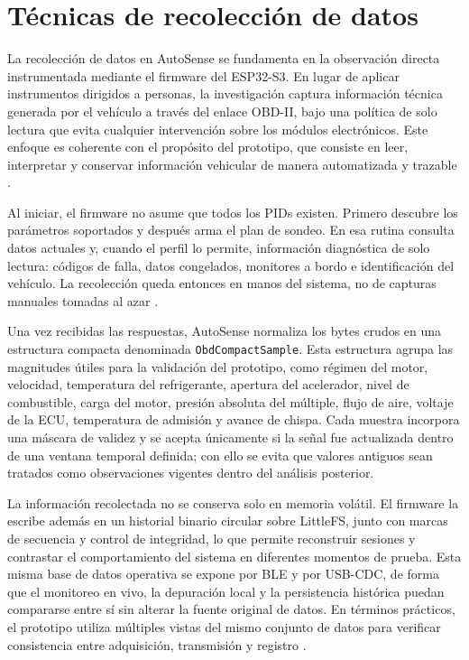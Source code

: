 \documentclass[12pt,letterpaper]{report}
\begin{document}
\section{Técnicas de recolección de datos}

\label{sec:tecnicas-recoleccion-datos}

La recolección de datos en AutoSense se fundamenta en la observación directa instrumentada mediante el firmware del ESP32-S3. En lugar de aplicar instrumentos dirigidos a personas, la investigación captura información técnica generada por el vehículo a través del enlace OBD-II, bajo una política de solo lectura que evita cualquier intervención sobre los módulos electrónicos. Este enfoque es coherente con el propósito del prototipo, que consiste en leer, interpretar y conservar información vehicular de manera automatizada y trazable \cite{sae2022_j1978_obdii_scan_tool,sae2025_j1979_diagnostic_test_modes,epa2016_vehicle_emissions_obd}.

Al iniciar, el firmware no asume que todos los PIDs existen. Primero descubre los parámetros soportados y después arma el plan de sondeo. En esa rutina consulta datos actuales y, cuando el perfil lo permite, información diagnóstica de solo lectura: códigos de falla, datos congelados, monitores a bordo e identificación del vehículo. La recolección queda entonces en manos del sistema, no de capturas manuales tomadas al azar \cite{sae2025_j1979_diagnostic_test_modes,epa2013_obd_readiness_best_practices}.

Una vez recibidas las respuestas, AutoSense normaliza los bytes crudos en una estructura compacta denominada \texttt{ObdCompactSample}. Esta estructura agrupa las magnitudes útiles para la validación del prototipo, como régimen del motor, velocidad, temperatura del refrigerante, apertura del acelerador, nivel de combustible, carga del motor, presión absoluta del múltiple, flujo de aire, voltaje de la ECU, temperatura de admisión y avance de chispa. Cada muestra incorpora una máscara de validez y se acepta únicamente si la señal fue actualizada dentro de una ventana temporal definida; con ello se evita que valores antiguos sean tratados como observaciones vigentes dentro del análisis posterior.

La información recolectada no se conserva solo en memoria volátil. El firmware la escribe además en un historial binario circular sobre LittleFS, junto con marcas de secuencia y control de integridad, lo que permite reconstruir sesiones y contrastar el comportamiento del sistema en diferentes momentos de prueba. Esta misma base de datos operativa se expone por BLE y por USB-CDC, de forma que el monitoreo en vivo, la depuración local y la persistencia histórica puedan compararse entre sí sin alterar la fuente original de datos. En términos prácticos, el prototipo utiliza múltiples vistas del mismo conjunto de datos para verificar consistencia entre adquisición, transmisión y registro \cite{shafi2018_vehicle_remote_health,camposferreira2023_vehicle_driver_monitoring}.
\end{document}
